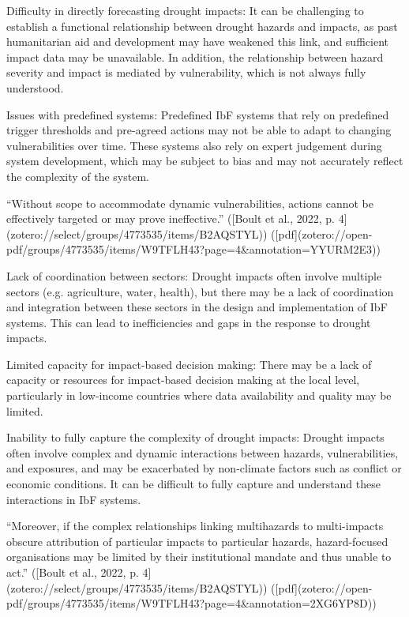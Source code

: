 {Difficulty in directly forecasting drought impacts: It can be challenging to establish a functional relationship between drought hazards and impacts, as past humanitarian aid and development may have weakened this link, and sufficient impact data may be unavailable. In addition, the relationship between hazard severity and impact is mediated by vulnerability, which is not always fully understood.

Issues with predefined systems: Predefined IbF systems that rely on predefined trigger thresholds and pre-agreed actions may not be able to adapt to changing vulnerabilities over time. These systems also rely on expert judgement during system development, which may be subject to bias and may not accurately reflect the complexity of the system.

“Without scope to accommodate dynamic vulnerabilities, actions cannot be effectively targeted or may prove ineffective.” ([Boult et al., 2022, p. 4](zotero://select/groups/4773535/items/B2AQSTYL)) ([pdf](zotero://open-pdf/groups/4773535/items/W9TFLH43?page=4&annotation=YYURM2E3))

Lack of coordination between sectors: Drought impacts often involve multiple sectors (e.g. agriculture, water, health), but there may be a lack of coordination and integration between these sectors in the design and implementation of IbF systems. This can lead to inefficiencies and gaps in the response to drought impacts.

Limited capacity for impact-based decision making: There may be a lack of capacity or resources for impact-based decision making at the local level, particularly in low-income countries where data availability and quality may be limited.

Inability to fully capture the complexity of drought impacts: Drought impacts often involve complex and dynamic interactions between hazards, vulnerabilities, and exposures, and may be exacerbated by non-climate factors such as conflict or economic conditions. It can be difficult to fully capture and understand these interactions in IbF systems.

“Moreover, if the complex relationships linking multihazards to multi-impacts obscure attribution of particular impacts to particular hazards, hazard-focused organisations may be limited by their institutional mandate and thus unable to act.” ([Boult et al., 2022, p. 4](zotero://select/groups/4773535/items/B2AQSTYL)) ([pdf](zotero://open-pdf/groups/4773535/items/W9TFLH43?page=4&annotation=2XG6YP8D))

}
